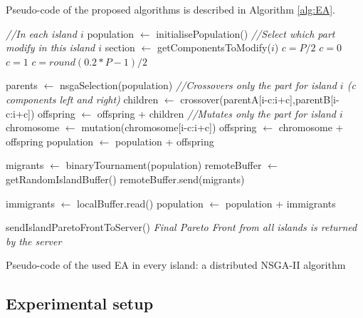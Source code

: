 \documentclass[preprint]{elsarticle}
\begin{document}
Pseudo-code of the proposed algorithms is described in Algorithm \ref{alg:EA}.

\begin{algorithm}[htb]

\begin{algorithmic}
\STATE \textit{//In each island $i$}
\STATE population $\gets$ initialisePopulation()
\STATE \textit{//Select which part modify in this island $i$}
\STATE section $\gets$ getComponentsToModify($i$)
	\STATE $c=P/2$
	\STATE $c=0$
	\STATE $c=1$
	\STATE $c=round(0.2*P-1)/2$
\ENDIF

    \STATE parents $\gets$ nsgaSelection(population)
    	\STATE \textit{//Crossovers only the part for island $i$ (c components left and right)}
    	\STATE children  $\gets$ crossover(parentA[i-c:i+c],parentB[i-c:i+c])
    	\STATE offspring $\gets$ offspring + children
    \ENDFOR
    		\STATE \textit{//Mutates only the part for island $i$}
    		\STATE chromosome $\gets$ mutation(chromosome[i-c:i+c])
    		\STATE offspring $\gets$ chromosome + offspring
    	\ENDIF
    \ENDFOR
    \STATE population $\gets$ population + offspring
    

      \STATE migrants $\gets$ binaryTournament(population)
      \STATE remoteBuffer $\gets$ getRandomIslandBuffer()
      \STATE remoteBuffer.send(migrants)
    \ENDIF

      \STATE immigrants $\gets$ localBuffer.read()
      \STATE population $\gets$ population + immigrants
    \ENDIF
\ENDWHILE

\STATE sendIslandParetoFrontToServer()
\STATE \textit{Final Pareto Front from all islands is returned by the server}
\end{algorithmic}

\caption{Pseudo-code of the used EA in every island: a distributed NSGA-II algorithm }
\label{alg:EA}
\end{algorithm}



%
\subsection{Experimental setup}
\end{document}
